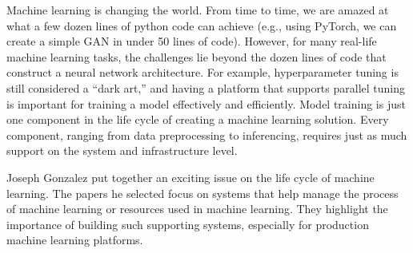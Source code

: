 \documentclass[11pt]{article}
\begin{document}
Machine learning is changing the world.  From time to time, we are
amazed at what a few dozen lines of python code can achieve (e.g.,
using PyTorch, we can create a simple GAN in under 50 lines of code).
However, for many real-life machine learning tasks, the challenges lie
beyond the dozen lines of code that construct a neural network
architecture. For example, hyperparameter tuning is still considered a
``dark art,'' and having a platform that supports parallel tuning is
important for training a model effectively and efficiently. Model
training is just one component in the life cycle of creating a machine
learning solution. Every component, ranging from data preprocessing to
inferencing, requires just as much support on the system and
infrastructure level.

Joseph Gonzalez put together an exciting issue on the life cycle of
machine learning. The papers he selected focus on systems that help
manage the process of machine learning or resources used in machine
learning. They highlight the importance of building such supporting
systems, especially for production machine learning platforms.
\end{document}
